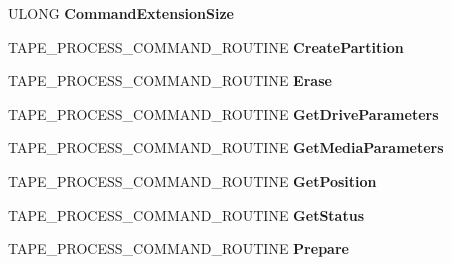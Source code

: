 \begin{DoxyCompactItemize}
U\+L\+O\+NG {\bfseries Command\+Extension\+Size}
\item 
\mbox{\label{struct___t_a_p_e___i_n_i_t___d_a_t_a_a5bf0b88bcaf8e1175ef6aea072f03c03}} 
T\+A\+P\+E\+\_\+\+P\+R\+O\+C\+E\+S\+S\+\_\+\+C\+O\+M\+M\+A\+N\+D\+\_\+\+R\+O\+U\+T\+I\+NE {\bfseries Create\+Partition}
\item 
\mbox{\label{struct___t_a_p_e___i_n_i_t___d_a_t_a_a64063872653acc082465acd1515de1ca}} 
T\+A\+P\+E\+\_\+\+P\+R\+O\+C\+E\+S\+S\+\_\+\+C\+O\+M\+M\+A\+N\+D\+\_\+\+R\+O\+U\+T\+I\+NE {\bfseries Erase}
\item 
\mbox{\label{struct___t_a_p_e___i_n_i_t___d_a_t_a_af4bcaa1e42f5aa732d23b174003b1ecb}} 
T\+A\+P\+E\+\_\+\+P\+R\+O\+C\+E\+S\+S\+\_\+\+C\+O\+M\+M\+A\+N\+D\+\_\+\+R\+O\+U\+T\+I\+NE {\bfseries Get\+Drive\+Parameters}
\item 
\mbox{\label{struct___t_a_p_e___i_n_i_t___d_a_t_a_aa48bf0ecb7f1c183612a0854419bafb1}} 
T\+A\+P\+E\+\_\+\+P\+R\+O\+C\+E\+S\+S\+\_\+\+C\+O\+M\+M\+A\+N\+D\+\_\+\+R\+O\+U\+T\+I\+NE {\bfseries Get\+Media\+Parameters}
\item 
\mbox{\label{struct___t_a_p_e___i_n_i_t___d_a_t_a_a358bbb238437ed598fe59ea603e45603}} 
T\+A\+P\+E\+\_\+\+P\+R\+O\+C\+E\+S\+S\+\_\+\+C\+O\+M\+M\+A\+N\+D\+\_\+\+R\+O\+U\+T\+I\+NE {\bfseries Get\+Position}
\item 
\mbox{\label{struct___t_a_p_e___i_n_i_t___d_a_t_a_a3e30a4a468cbd28c7e62ac26e4b8b9d8}} 
T\+A\+P\+E\+\_\+\+P\+R\+O\+C\+E\+S\+S\+\_\+\+C\+O\+M\+M\+A\+N\+D\+\_\+\+R\+O\+U\+T\+I\+NE {\bfseries Get\+Status}
\item 
\mbox{\label{struct___t_a_p_e___i_n_i_t___d_a_t_a_afed42d66b878a5e1cf811c132b38c358}} 
T\+A\+P\+E\+\_\+\+P\+R\+O\+C\+E\+S\+S\+\_\+\+C\+O\+M\+M\+A\+N\+D\+\_\+\+R\+O\+U\+T\+I\+NE {\bfseries Prepare}
\item 
\mbox{\label{struct___t_a_p_e___i_n_i_t___d_a_t_a_a587113a45fe8f9eeced8f9785553e072}} 

\end{DoxyCompactItemize}
